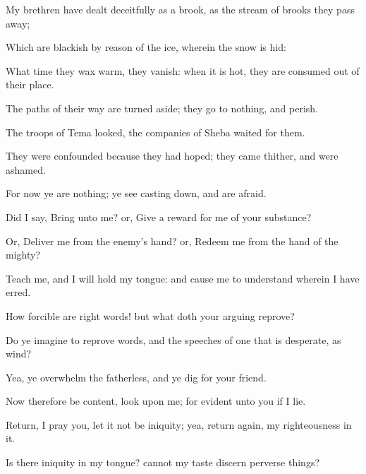 {My
brethren have dealt
deceitfully as a
brook,
{} as the
stream of
brooks they pass
away;

Which are
blackish by reason of the
ice,
{} wherein the
snow is
hid:

What
time they wax
warm, they
vanish: when it is
hot, they are consumed
out of their
place.

The
paths of their
way are turned
aside; they
go to
nothing, and
perish.

The
troops of
Tema
looked, the
companies of
Sheba
waited for them.

They were
confounded because they had
hoped; they
came thither, and were
ashamed.

For now ye are nothing; ye
see
{} casting
down, and are
afraid.


\par }{\PP {}Did I
say,
Bring unto me? or, Give a
reward for me of your
substance?

Or,
Deliver me from the
enemy’s
hand? or,
Redeem me from the
hand of the
mighty?

Teach me, and I will hold my
tongue: and cause me to
understand wherein I have
erred.

How
forcible are
right
words! but what doth your
arguing
reprove?

Do ye
imagine to
reprove
words, and the
speeches of one that is
desperate,
{} as
wind?

Yea, ye
overwhelm the
fatherless, and ye
dig
{} for your
friend.

Now therefore be
content,
look upon me; for
{}
evident unto you if I
lie.

Return, I pray you, let it not be
iniquity; yea, return
again, my
righteousness
{} in it.

Is
there
iniquity in my
tongue? cannot my
taste
discern perverse
things?




}
